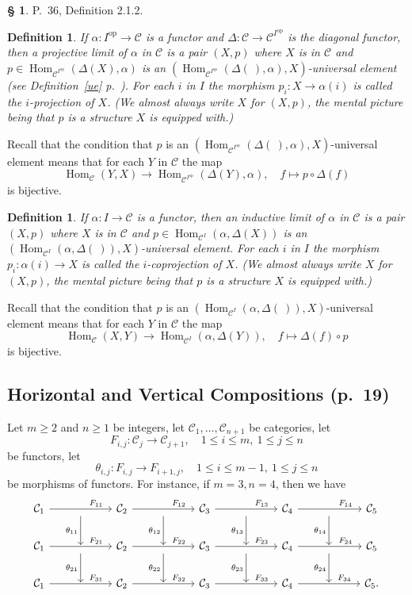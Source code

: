 \documentclass[12pt]{article}
\newtheorem{df}[thm]{Definition}%
\theoremstyle{remark}
\theoremstyle{definition}
\newtheorem{s}[thm]{\S}
\newcommand{\C}{\mathcal C}
\DeclareMathOperator{\Hom}{Hom}%
\DeclareMathOperator{\op}{op}
\begin{document}
\begin{s} 
P.~36, Definition 2.1.2. 
%
\begin{df}\label{p}
If $\alpha:I^{\op}\to\C$ is a functor and $\Delta:\C\to\C^{I^{\op}}$ is the diagonal functor, then a {\em projective limit of} $\alpha$ {\em in} $\C$ is a pair $(X,p)$ where $X$ is in $\C$ and $p\in\Hom_{\C^{I^{\op}}}(\Delta(X),\alpha)$ is an $(\Hom_{\C^{I^{\op}}}(\Delta(\ ),\alpha),X)$-universal element (see Definition~\ref{ue} p.~\pageref{ue}). For each $i$ in $I$ the morphism $p_i:X\to\alpha(i)$ is called the $i$-{\em projection} of $X$. (We almost always write $X$ for $(X,p)$, the mental picture being that $p$ is a structure $X$ is equipped with.)
\end{df}
%
Recall that the condition that $p$ is an $(\Hom_{\C^{I^{\op}}}(\Delta(\ ),\alpha),X)$-universal element means that for each $Y$ in $\C$ the map 
$$
\Hom_\C(Y,X)\to\Hom_{\C^{I^{\op}}}(\Delta(Y),\alpha),\quad f\mapsto p\circ\Delta(f)
$$ 
is bijective.
%
\begin{df}\label{c}
If $\alpha:I\to\C$ is a functor, then an {\em inductive limit of} $\alpha$ {\em in} $\C$ is a pair $(X,p)$ where $X$ is in $\C$ and $p\in\Hom_{\C^I}(\alpha,\Delta(X))$ is an $(\Hom_{\C^I}(\alpha,\Delta(\ )),X)$-universal element. For each $i$ in $I$ the morphism $p_i:\alpha(i)\to X$ is called the $i$-{\em coprojection} of $X$. (We almost always write $X$ for $(X,p)$, the mental picture being that $p$ is a structure $X$ is equipped with.)
\end{df}
%
Recall that the condition that $p$ is an $(\Hom_{\C^I}(\alpha,\Delta(\ )),X)$-universal element means that for each $Y$ in $\C$ the map 
\begin{equation}\label{cue}
\Hom_\C(X,Y)\to\Hom_{\C^I}(\alpha,\Delta(Y)),\quad f\mapsto\Delta(f)\circ p
\end{equation}
is bijective.
\end{s}
%
%
\subsection{Horizontal and Vertical Compositions (p.~19)}
%
Let $m\ge2$ and $n\ge1$ be integers, let $\C_1,\dots,\C_{n+1}$ be categories, let 
$$
F_{i,j}:\C_j\to\C_{j+1},\quad1\le i\le m,\ 1\le j\le n
$$
be functors, let 
$$
\theta_{i,j}:F_{i,j}\to F_{i+1,j},\quad1\le i\le m-1,\ 1\le j\le n
$$
be morphisms of functors. For instance, if $m=3,n=4$, then we have 
$$
\begin{tikzcd}
%
\C_1\ar{rr}{}[near end]{F_{11}}&\ar{d}[swap]{\theta_{11}}&\C_2\ar{rr}{}[near end]{F_{12}}&\ar{d}[swap]{\theta_{12}}&\C_3\ar{rr}{}[near end]{F_{13}}&\ar{d}[swap]{\theta_{13}}&\C_4\ar{rr}{}[near end]{F_{14}}&\ar{d}[swap]{\theta_{14}}&\C_5\\ 
%
\C_1\ar{rr}{}[near end]{F_{21}}&{}\ar{d}[swap]{\theta_{21}}&\C_2\ar{rr}{}[near end]{F_{22}}&{}\ar{d}[swap]{\theta_{22}}&\C_3\ar{rr}{}[near end]{F_{23}}&{}\ar{d}[swap]{\theta_{23}}&\C_4\ar{rr}{}[near end]{F_{24}}&{}\ar{d}[swap]{\theta_{24}}&\C_5\\ 
%
\C_1\ar{rr}{}[near end]{F_{31}}&{}&\C_2\ar{rr}{}[near end]{F_{32}}&{}&\C_3\ar{rr}{}[near end]{F_{33}}&{}&\C_4\ar{rr}{}[near end]{F_{34}}&{}&\C_5.
\end{tikzcd}
$$ 
\end{document}
